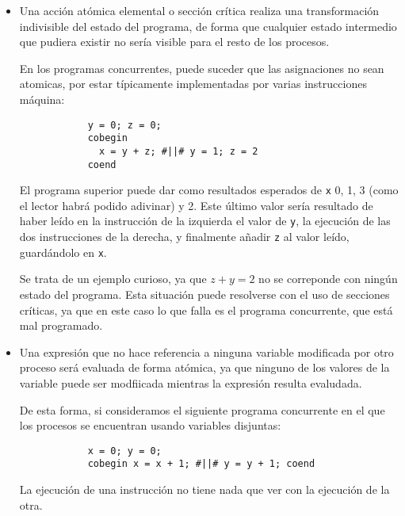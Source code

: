 \begin{itemize}
    \item Una acción atómica elemental o sección crítica realiza una transformación indivisible del estado del programa, de forma que cualquier estado intermedio que pudiera existir no sería visible para el resto de los procesos.

        En los programas concurrentes, puede suceder que las asignaciones no sean atomicas, por estar típicamente implementadas por varias instrucciones máquina:

        \begin{verbatim}
            y = 0; z = 0;
            cobegin
              x = y + z; #||# y = 1; z = 2
            coend
        \end{verbatim}
        El programa superior puede dar como resultados esperados de \verb|x| 0, 1, 3 (como el lector habrá podido adivinar) y 2. Este último valor sería resultado de haber leído en la instrucción de la izquierda el valor de \verb|y|, la ejecución de las dos instrucciones de la derecha, y finalmente añadir \verb|z| al valor leído, guardándolo en \verb|x|.

        Se trata de un ejemplo curioso, ya que $z+y=2$ no se correponde con ningún estado del programa. Esta situación puede resolverse con el uso de secciones críticas, ya que en este caso lo que falla es el programa concurrente, que está mal programado.
        
    \item Una expresión que no hace referencia a ninguna variable modificada por otro proceso será evaluada de forma atómica, ya que ninguno de los valores de la variable puede ser modfiicada mientras la expresión resulta evaludada.

        De esta forma, si consideramos el siguiente programa concurrente en el que los procesos se encuentran usando variables disjuntas:
        \begin{verbatim}
            x = 0; y = 0;
            cobegin x = x + 1; #||# y = y + 1; coend
        \end{verbatim}
        La ejecución de una instrucción no tiene nada que ver con la ejecución de la otra.
\end{itemize}

